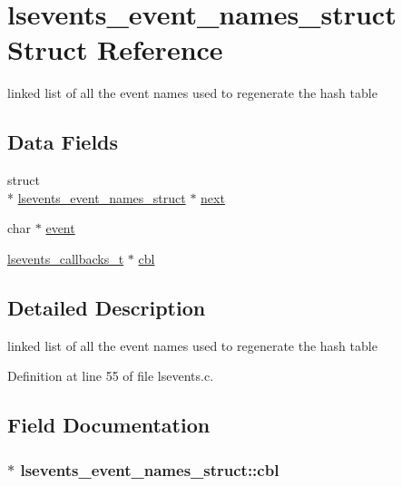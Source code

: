 \hypertarget{structlsevents__event__names__struct}{\section{lsevents\-\_\-event\-\_\-names\-\_\-struct Struct Reference}
\label{structlsevents__event__names__struct}
}


linked list of all the event names used to regenerate the hash table  


\subsection*{Data Fields}
\begin{DoxyCompactItemize}
\item 
struct \\*
\hyperlink{structlsevents__event__names__struct}{lsevents\-\_\-event\-\_\-names\-\_\-struct} $\ast$ \hyperlink{structlsevents__event__names__struct_a748e63bd8825f239936c5bf165ca869e}{next}
\item 
char $\ast$ \hyperlink{structlsevents__event__names__struct_a07e5a0f2b74c08f388626f18b37cd1b0}{event}
\item 
\hyperlink{lsevents_8c_af904cc333bdd09b03bf41131d9744e94}{lsevents\-\_\-callbacks\-\_\-t} $\ast$ \hyperlink{structlsevents__event__names__struct_afdd17d4d473fcf095a279953ea5e0f1c}{cbl}
\end{DoxyCompactItemize}


\subsection{Detailed Description}
linked list of all the event names used to regenerate the hash table 

Definition at line 55 of file lsevents.\-c.



\subsection{Field Documentation}
\hypertarget{structlsevents__event__names__struct_afdd17d4d473fcf095a279953ea5e0f1c}{
\subsubsection[{cbl}]{$\ast$ lsevents\-\_\-event\-\_\-names\-\_\-struct\-::cbl}}\label{structlsevents__event__names__struct_afdd17d4d473fcf095a279953ea5e0f1c}


